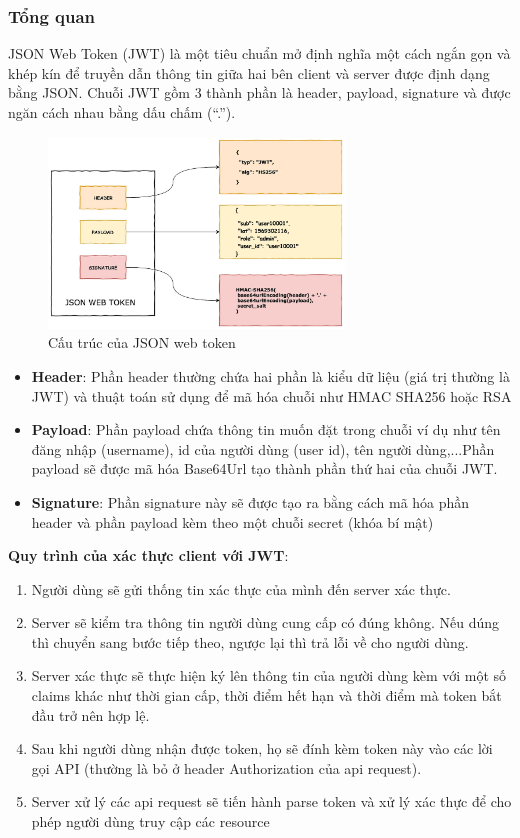 \subsubsection{Tổng quan}
JSON Web Token (JWT) \cite{jwt} là một tiêu chuẩn mở định nghĩa một cách ngắn gọn và khép
kín để truyền dẫn thông tin giữa hai bên client và server được định dạng bằng JSON.
Chuỗi JWT gồm 3 thành phần là header, payload, signature và được ngăn cách nhau bằng
dấu chấm (“.”).
\begin{figure}[H]
    \centering
    \includegraphics[width=0.7\textwidth]{Images/technology/jwt_structure.png}
    \caption{Cấu trúc của JSON web token}
\end{figure}
\begin{itemize}
    \item \textbf{Header}: Phần header thường chứa hai phần là kiểu dữ liệu (giá trị thường là JWT) và thuật toán sử dụng để mã hóa chuỗi như HMAC SHA256 hoặc RSA
    \item \textbf{Payload}: Phần payload chứa thông tin muốn đặt trong chuỗi ví dụ như tên đăng nhập (username), id của người dùng (user id), tên người dùng,...Phần payload sẽ được mã hóa Base64Url tạo thành phần thứ hai của chuỗi JWT.
    \item \textbf{Signature}: Phần signature này sẽ được tạo ra bằng cách mã hóa phần header và phần payload kèm theo một chuỗi secret (khóa bí mật)
\end{itemize}
\textbf{Quy trình của xác thực client với JWT}:
\begin{enumerate}
    \item Người dùng sẽ gửi thống tin xác thực của mình đến server xác thực.
    \item Server sẽ kiểm tra thông tin người dùng cung cấp có đúng không. Nếu dúng thì chuyển sang bước tiếp theo, ngược lại thì trả lỗi về cho người dùng.
    \item Server xác thực sẽ thực hiện ký lên thông tin của người dùng kèm với một số claims khác như thời gian cấp, thời điểm hết hạn và thời điểm mà token bắt đầu trở nên hợp lệ.
    \item Sau khi người dùng nhận được token, họ sẽ đính kèm token này vào các lời gọi API (thường là bỏ ở header Authorization của api request).
    \item Server xử lý các api request sẽ tiến hành parse token và xử lý xác thực để cho phép người dùng truy cập các resource
\end{enumerate}
